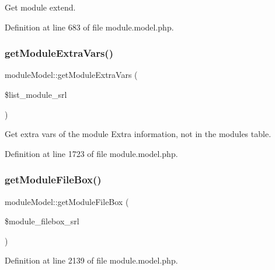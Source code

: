 Get module extend. 



Definition at line 683 of file module.\+model.\+php.

\mbox{\label{classmoduleModel_a4e93226573048a7b9c8e2cb842d0cb30}} 
\subsubsection{\texorpdfstring{get\+Module\+Extra\+Vars()}{getModuleExtraVars()}}
{\footnotesize\ttfamily module\+Model\+::get\+Module\+Extra\+Vars (\begin{DoxyParamCaption}\item[{}]{\$list\+\_\+module\+\_\+srl }\end{DoxyParamCaption})}



Get extra vars of the module Extra information, not in the modules table. 



Definition at line 1723 of file module.\+model.\+php.

\mbox{\label{classmoduleModel_a792e14b71d66044513a646a44216be17}} 
\subsubsection{\texorpdfstring{get\+Module\+File\+Box()}{getModuleFileBox()}}
{\footnotesize\ttfamily module\+Model\+::get\+Module\+File\+Box (\begin{DoxyParamCaption}\item[{}]{\$module\+\_\+filebox\+\_\+srl }\end{DoxyParamCaption})}



Definition at line 2139 of file module.\+model.\+php.

\mbox{\label{classmoduleModel_a8f3a098b40649594a591e5ea8bd15d96}} 
